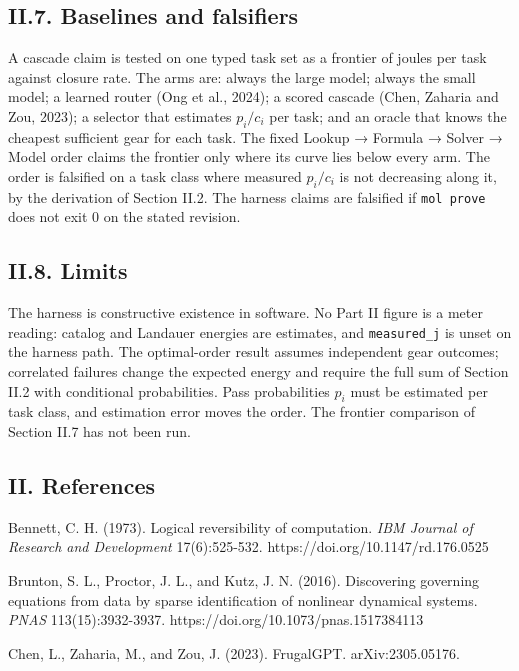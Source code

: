 \documentclass[
  10pt,
]{article}
\begin{document}
\subsection{II.7. Baselines and
falsifiers}\label{ii.7.-baselines-and-falsifiers}

A cascade claim is tested on one typed task set as a frontier of joules
per task against closure rate. The arms are: always the large model;
always the small model; a learned router (Ong et al., 2024); a scored
cascade (Chen, Zaharia and Zou, 2023); a selector that estimates
\(p_i / c_i\) per task; and an oracle that knows the cheapest sufficient
gear for each task. The fixed Lookup → Formula → Solver → Model order
claims the frontier only where its curve lies below every arm. The order
is falsified on a task class where measured \(p_i / c_i\) is not
decreasing along it, by the derivation of Section II.2. The harness
claims are falsified if \texttt{mol\ prove} does not exit 0 on the
stated revision.

\subsection{II.8. Limits}\label{ii.8.-limits}

The harness is constructive existence in software. No Part II figure is
a meter reading: catalog and Landauer energies are estimates, and
\texttt{measured\_j} is unset on the harness path. The optimal-order
result assumes independent gear outcomes; correlated failures change the
expected energy and require the full sum of Section II.2 with
conditional probabilities. Pass probabilities \(p_i\) must be estimated
per task class, and estimation error moves the order. The frontier
comparison of Section II.7 has not been run.

\subsection{II. References}\label{ii.-references}

Bennett, C. H. (1973). Logical reversibility of computation. \emph{IBM
Journal of Research and Development} 17(6):525-532.
https://doi.org/10.1147/rd.176.0525

Brunton, S. L., Proctor, J. L., and Kutz, J. N. (2016). Discovering
governing equations from data by sparse identification of nonlinear
dynamical systems. \emph{PNAS} 113(15):3932-3937.
https://doi.org/10.1073/pnas.1517384113

Chen, L., Zaharia, M., and Zou, J. (2023). FrugalGPT. arXiv:2305.05176.
\end{document}
